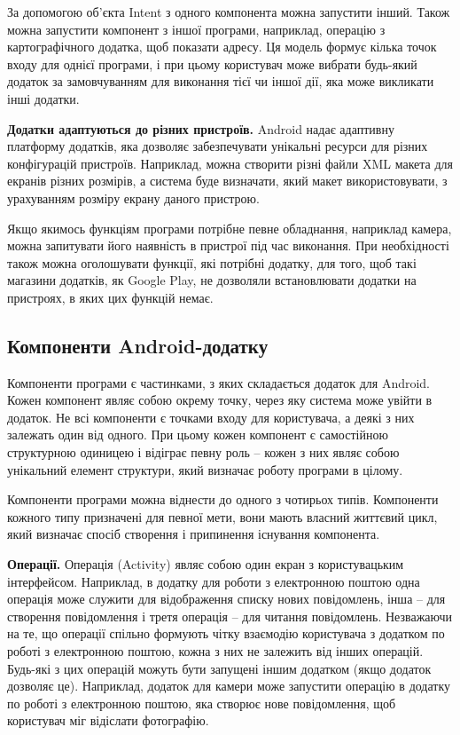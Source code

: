 \documentclass[../main.tex]{subfiles}
\begin{document}
За допомогою об'єкта Intent з одного компонента можна запустити інший. Також можна запустити компонент з іншої програми, наприклад, операцію з картографічного додатка, щоб показати адресу. Ця модель формує кілька точок входу для однієї програми, і при цьому користувач може вибрати будь-який додаток за замовчуванням для виконання тієї чи іншої дії, яка може викликати інші додатки.
	
\textbf{Додатки адаптуються до різних пристроїв.} 
Android надає адаптивну платформу додатків, яка дозволяє забезпечувати унікальні ресурси для різних конфігурацій пристроїв. Наприклад, можна створити різні файли XML макета для екранів різних розмірів, а система буде визначати, який макет використовувати, з урахуванням розміру екрану даного пристрою.

Якщо якимось функціям програми потрібне певне обладнання, наприклад камера, можна запитувати його наявність в пристрої під час виконання. При необхідності також можна оголошувати функції, які потрібні додатку, для того, щоб такі магазини додатків, як Google Play, не дозволяли встановлювати додатки на пристроях, в яких цих функцій немає.

\subsection{Компоненти Android-додатку}

Компоненти програми є частинками, з яких складається додаток для Android. Кожен компонент являє собою окрему точку, через яку система може увійти в додаток. Не всі компоненти є точками входу для користувача, а деякі з них залежать один від одного. При цьому кожен компонент є самостійною структурною одиницею і відіграє певну роль -- кожен з них являє собою унікальний елемент структури, який визначає роботу програми в цілому.

Компоненти програми можна віднести до одного з чотирьох типів. Компоненти кожного типу призначені для певної мети, вони мають власний життєвий цикл, який визначає спосіб створення і припинення існування компонента.

\textbf{Операції.} Операція (Activity) являє собою один екран з користувацьким інтерфейсом. Наприклад, в додатку для роботи з електронною поштою одна операція може служити для відображення списку нових повідомлень, інша -- для створення повідомлення і третя операція -- для читання повідомлень. Незважаючи на те, що операції спільно формують чітку взаємодію користувача з додатком по роботі з електронною поштою, кожна з них не залежить від інших операцій. Будь-які з цих операцій можуть бути запущені іншим додатком (якщо додаток дозволяє це). Наприклад, додаток для камери може запустити операцію в додатку по роботі з електронною поштою, яка створює нове повідомлення, щоб користувач міг відіслати фотографію.
\end{document}
